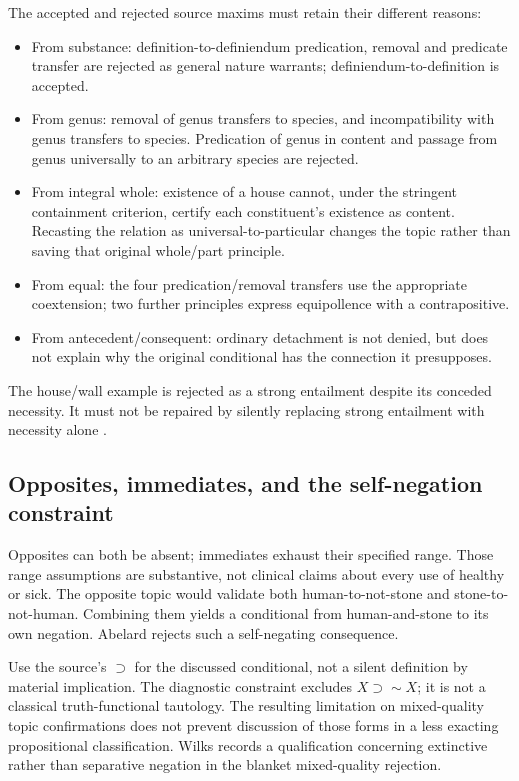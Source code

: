 The accepted and rejected source maxims must retain their
different reasons:

\begin{itemize}
\item From substance: definition-to-definiendum predication,
  removal and predicate transfer are rejected as general
  nature warrants; definiendum-to-definition is accepted.
\item From genus: removal of genus transfers to species,
  and incompatibility with genus transfers to species.
  Predication of genus in content and passage from genus
  universally to an arbitrary species are rejected.
\item From integral whole: existence of a house cannot,
  under the stringent containment criterion, certify each
  constituent's existence as content. Recasting the relation
  as universal-to-particular changes the topic rather than
  saving that original whole/part principle.
\item From equal: the four predication/removal transfers
  use the appropriate coextension; two further principles
  express equipollence with a contrapositive.
\item From antecedent/consequent: ordinary detachment is
  not denied, but does not explain why the original
  conditional has the connection it presupposes.
\end{itemize}

The house/wall example is rejected as a strong entailment
despite its conceded necessity. It must not be repaired by
silently replacing strong entailment with necessity alone
\cite[pp.~127--132]{Wilks2007FordhamAbelard}.

\subsection{Opposites, immediates, and the self-negation constraint}

Opposites can both be absent; immediates exhaust their
specified range. Those range assumptions are substantive,
not clinical claims about every use of healthy or sick.
The opposite topic would validate both human-to-not-stone
and stone-to-not-human. Combining them yields a conditional
from human-and-stone to its own negation.
Abelard rejects such a self-negating consequence.

Use the source's \(\supset\) for the discussed conditional,
not a silent definition by material implication.
The diagnostic constraint excludes \(X\supset\sim X\);
it is not a classical truth-functional tautology.
The resulting limitation on mixed-quality topic confirmations
does not prevent discussion of those forms in a less exacting
propositional classification.
Wilks records a qualification concerning extinctive rather
than separative negation in the blanket mixed-quality rejection.

